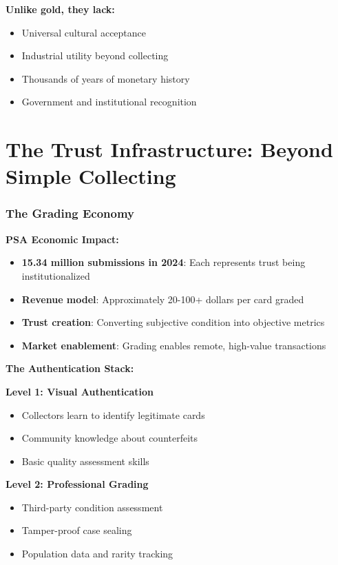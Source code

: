 \documentclass[11pt,oneside]{book}
\begin{document}
{{{{{{\textbf{Unlike gold, they lack:}
\begin{itemize}
\item Universal cultural acceptance
\item Industrial utility beyond collecting
\item Thousands of years of monetary history
\item Government and institutional recognition
\end{itemize}

\section{The Trust Infrastructure: Beyond Simple Collecting}

\subsubsection{The Grading Economy}

\textbf{PSA Economic Impact:}
\begin{itemize}
\item \textbf{15.34 million submissions in 2024}: Each represents trust being institutionalized
\item \textbf{Revenue model}: Approximately 20-100+ dollars per card graded
\item \textbf{Trust creation}: Converting subjective condition into objective metrics
\item \textbf{Market enablement}: Grading enables remote, high-value transactions
\end{itemize}

\textbf{The Authentication Stack:}

\textbf{Level 1: Visual Authentication}
\begin{itemize}
\item Collectors learn to identify legitimate cards
\item Community knowledge about counterfeits
\item Basic quality assessment skills
\end{itemize}

\textbf{Level 2: Professional Grading}
\begin{itemize}
\item Third-party condition assessment
\item Tamper-proof case sealing
\item Population data and rarity tracking
\end{itemize}

}}}}}}
\end{document}
